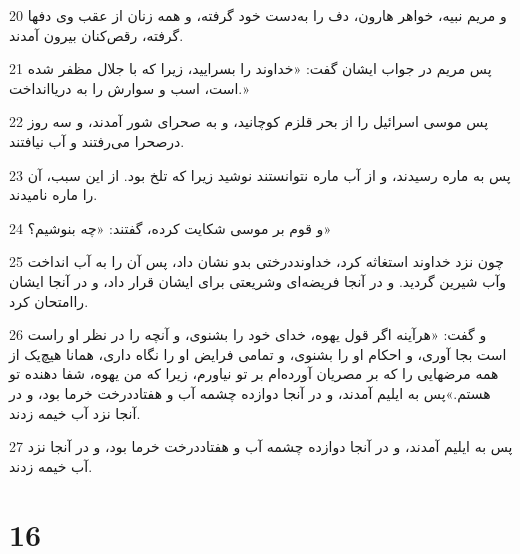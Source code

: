 \par 20 و مریم نبیه، خواهر هارون، دف را به‌دست خود گرفته، و همه زنان از عقب وی دفها گرفته، رقص‌کنان بیرون آمدند.
\par 21 پس مریم در جواب ایشان گفت: «خداوند را بسرایید، زیرا که با جلال مظفر شده است، اسب و سوارش را به دریاانداخت.»
\par 22 پس موسی اسرائیل را از بحر قلزم کوچانید، و به صحرای شور آمدند، و سه روز درصحرا می‌رفتند و آب نیافتند.
\par 23 پس به ماره رسیدند، و از آب ماره نتوانستند نوشید زیرا که تلخ بود. از این سبب، آن را ماره نامیدند.
\par 24 و قوم بر موسی شکایت کرده، گفتند: «چه بنوشیم؟»
\par 25 چون نزد خداوند استغاثه کرد، خداونددرختی بدو نشان داد، پس آن را به آب انداخت وآب شیرین گردید. و در آنجا فریضه‌ای وشریعتی برای ایشان قرار داد، و در آنجا ایشان راامتحان کرد.
\par 26 و گفت: «هرآینه اگر قول یهوه، خدای خود را بشنوی، و آنچه را در نظر او راست است بجا آوری، و احکام او را بشنوی، و تمامی فرایض او را نگاه داری، همانا هیچ‌یک از همه مرضهایی را که بر مصریان آورده‌ام بر تو نیاورم، زیرا که من یهوه، شفا دهنده تو هستم.»پس به ایلیم آمدند، و در آنجا دوازده چشمه آب و هفتاددرخت خرما بود، و در آنجا نزد آب خیمه زدند.
\par 27 پس به ایلیم آمدند، و در آنجا دوازده چشمه آب و هفتاددرخت خرما بود، و در آنجا نزد آب خیمه زدند. 
 
\chapter{16}

